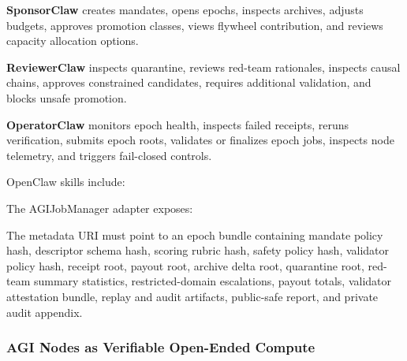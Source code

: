 \textbf{SponsorClaw} creates mandates, opens epochs, inspects archives,
adjusts budgets, approves promotion classes, views flywheel
contribution, and reviews capacity allocation options.

\textbf{ReviewerClaw} inspects quarantine, reviews red-team rationales,
inspects causal chains, approves constrained candidates, requires
additional validation, and blocks unsafe promotion.

\textbf{OperatorClaw} monitors epoch health, inspects failed receipts,
reruns verification, submits epoch roots, validates or finalizes epoch
jobs, inspects node telemetry, and triggers fail-closed controls.

OpenClaw skills include:

\begin{Shaded}
\begin{Highlighting}[]
\end{Highlighting}
\end{Shaded}

The AGIJobManager adapter exposes:

\begin{Shaded}
\begin{Highlighting}[]
\end{Highlighting}
\end{Shaded}

The metadata URI must point to an epoch bundle containing mandate policy
hash, descriptor schema hash, scoring rubric hash, safety policy hash,
validator policy hash, receipt root, payout root, archive delta root,
quarantine root, red-team summary statistics, restricted-domain
escalations, payout totals, validator attestation bundle, replay and
audit artifacts, public-safe report, and private audit appendix.

\subsubsection{AGI Nodes as Verifiable Open-Ended
Compute}\label{agi-nodes-as-verifiable-open-ended-compute}

